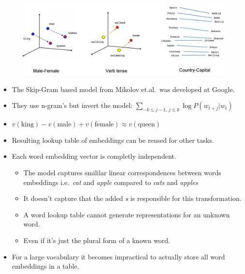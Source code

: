 \documentclass[11pt, a4paper, landscape]{article}
\begin{document}
\vfill
\begin{figure}[H]
\begin{center}
  \includegraphics[width=.8\textwidth]{../article/img/linear-relationships}
  \label{fig:classic_nnlm}
\end{center}
\end{figure}
\vfill
\begin{itemize}
\item The Skip-Gram based model from Mikolov et.al.\ was developed at Google.
\item They use n-gram's but invert the model: ${\displaystyle \sum _{-k\leq j-1,\,j\leq k}\log P(w_{t+j}|w_{t})}$
\item ${\displaystyle v(\mathrm {king} )-v(\mathrm {male} )+v(\mathrm {female} )\approx v(\mathrm {queen} )}$
\item Resulting lookup table of embeddings can be reused for other tasks.
\end{itemize}
\vfill

\NewPage{}

\vfill
\begin{itemize}
\item Each word embedding vector is completly independent. 
\begin{itemize}
  \item The model captures smililar linear correspondences between words embeddings i.e.\
        \textit{cat} and \textit{apple} compared to \textit{cats} and \textit{apples} 
  \item It doesn't capture that the added \textit{s} is responsible for this transformation. 
  \item A word lookup table cannot generate representations for an unknown word.
  \item Even if it's just the plural form of a known word.
\end{itemize}
\item For a large vocabulary it becomes impractical to actually store all word embeddings in a table.
\end{itemize}
\vfill
\end{document}
